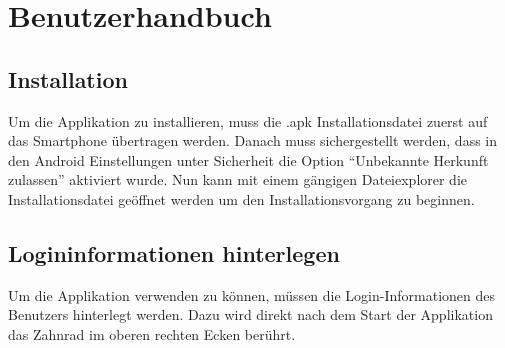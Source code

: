 \pagebreak
\section{Benutzerhandbuch}

\subsection{Installation}
Um die Applikation zu installieren, muss die .apk Installationsdatei zuerst auf das Smartphone übertragen werden. Danach muss sichergestellt werden, dass in den Android Einstellungen unter Sicherheit die Option \enquote{Unbekannte Herkunft zulassen} aktiviert wurde. Nun kann mit einem gängigen Dateiexplorer die Installationsdatei geöffnet werden um den Installationsvorgang zu beginnen.
\subsection{Logininformationen hinterlegen}

Um die Applikation verwenden zu können, müssen die Login-Informationen des Benutzers hinterlegt werden. Dazu wird direkt nach dem Start der Applikation das Zahnrad im oberen rechten Ecken berührt.

